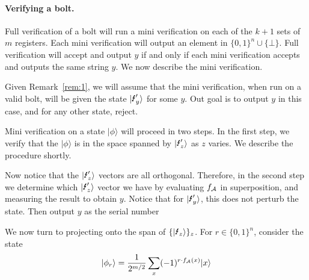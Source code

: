 \paragraph{Verifying a bolt.}  Full verification of a bolt will run a mini verification on each of the $k+1$ sets of $m$ registers.  Each mini verification will output an element in $\{0,1\}^n\cup\{\bot\}$.  Full verification will accept and output $y$ if and only if each mini verification accepts and outputs the same string $y$.  We now describe the mini verification.

Given Remark~\ref{rem:1}, we will assume that the mini verification, when run on a valid bolt, will be given the state $\qlightningp[y]$ for some $y$.  Out goal is to output $y$ in this case, and for any other state, reject.

Mini verification on a state $|\phi\rangle$ will proceed in two steps.  In the first step, we verify that the $|\phi\rangle$ is in the space spanned by $\qlightningp[z]$ as $z$ varies.  We describe the procedure shortly.  

Now notice that the $\qlightningp[z]$ vectors are all orthogonal.  Therefore, in the second step we determine which $\qlightningp[z]$ vector we have by evaluating $f_{\mathcal{A}}$ in superposition, and measuring the result to obtain $y$.  Notice that for $\qlightningp[y]$, this does not perturb the state.  Then output $y$ as the serial number

We now turn to projecting onto the span of $\{\qlightning[z]\}_z$.  For $r\in\{0,1\}^n$, consider the state \[|\phi_r\rangle=\frac{1}{2^{m/2}}\sum_x (-1)^{r\cdot f_{\mathcal{A}}(x)}|x\rangle\]

